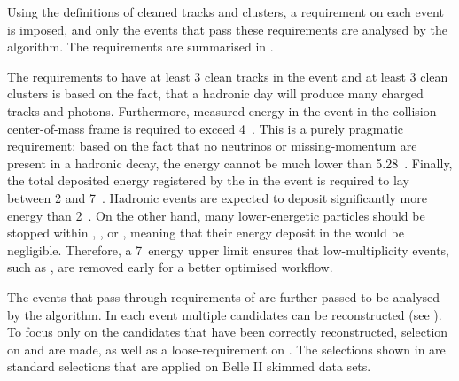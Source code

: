 Using the definitions of cleaned tracks and \ECL clusters, a requirement on each event is imposed, and only the events that pass these requirements are analysed by the \FEI algorithm.
The requirements are summarised in .

\begin{table}[htbp!]
    \centering
     \caption{\label{tab:fei_precuts} \FEI pre-selections.}
\end{table}
The requirements to have at least 3 clean tracks in the event and at least 3 clean \ECL clusters is based on the fact, that a hadronic day will produce many charged tracks and photons.
Furthermore, measured energy in the event in the \epem collision center-of-mass frame is required to exceed 4~\gev.
This is a purely pragmatic requirement: based on the fact that no neutrinos or missing-momentum are present in a hadronic decay, the energy cannot be much lower than 5.28~\gev.
Finally, the total deposited energy registered by the \ECL in the event is required to lay between 2 and 7~\gev.
Hadronic events are expected to deposit significantly more energy than 2~\gev.
On the other hand, many lower-energetic particles should be stopped within \PXD, \SVD, \CDC or \TOP, meaning that their energy deposit in the \ECL would be negligible.
Therefore, a 7~\gev \ECL energy upper limit ensures that low-multiplicity events, such as \epem\ra\epem, are removed early for a better optimised workflow.

The events that pass through requirements of  are further passed to be analysed by the \FEI algorithm.
In each event multiple \FEI candidates can be reconstructed (see ).
To focus only on the candidates that have been correctly reconstructed, selection on \DeltaE and \Mbc are made, as well as a loose-requirement on \feiProb.
The selections shown in  are standard selections that are applied on Belle II \FEI skimmed data sets.

